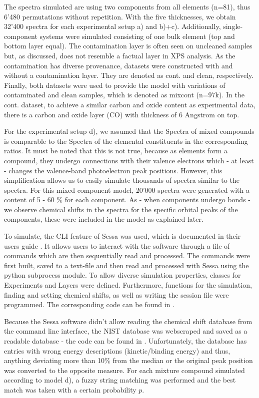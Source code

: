 The spectra simulated are using two components from all elements (n=81), thus 6'480 permutations without repetition. With the five thicknesses, we obtain 32'400 spectra for each experimental setup a) and b)+c). Additionally, single-component systems were simulated consisting of one bulk element (top and bottom layer equal). The contamination layer is often seen on uncleaned samples but, as discussed, does not resemble a factual layer in XPS analysis. As the contamination has diverse provenance, datasets were constructed with and without a contamination layer. They are denoted as cont. and clean, respectively. Finally, both datasets were used to provide the model with variations of contaminated and clean samples, which is denoted as mixcont (n=97k).
In the cont. dataset, to achieve a similar carbon and oxide content as experimental data, there is a carbon and oxide layer (CO) with thickness of 6 Angstrom on top.

For the experimental setup d), we assumed that the Spectra of mixed compounds is comparable to the Spectra of the elemental constituents in the corresponding ratios. It must be noted that this is not true, because as elements form a compound, they undergo connections with their valence electrons which - at least - changes the valence-band photoelectron peak positions. However, this simplification allows us to easily simulate thousands of spectra similar to the spectra. For this mixed-component model, 20'000 spectra were generated with a content of 5 - 60 \% for each component. As - when components undergo bonds - we observe chemical shifts in the spectra for the specific orbital peaks of the components, these were included in the model as explained later.

To simulate, the CLI feature of Sessa was used, which is documented in their users guide \cite{werner_simulation_2021}. It allows users to interact with the software through a file of commands which are then sequentially read and processed. The commands were first built, saved to a text-file and then read and processed with Sessa using the python subprocess module. To allow diverse simulation properties, classes for Experiments and Layers were defined. Furthermore, functions for the simulation, finding and setting chemical shifts, as well as writing the session file were programmed. The corresponding code can be found in .

Because the Sessa software didn't allow reading the chemical shift database from the command line interface, the NIST database was webscraped and saved as a readable database - the code can be found in . Unfortunately, the database has entries with wrong energy descriptions (kinetic/binding energy) and thus, anything deviating more than 10\% from the median or the original peak position was converted to the opposite measure.
For each mixture compound simulated according to model d), a fuzzy string matching was performed and the best match was taken with a certain probability $p$.


